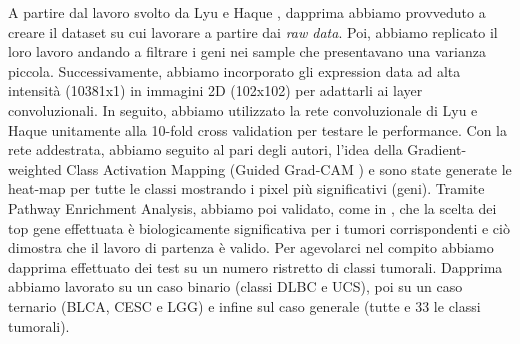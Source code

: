 A partire dal lavoro svolto da Lyu e Haque \cite{lyu2018deep}, dapprima abbiamo provveduto a creare il dataset 
su cui lavorare a partire dai \textit{raw data}. Poi, abbiamo replicato il loro lavoro andando a filtrare i geni 
nei sample che presentavano una varianza piccola. 
Successivamente, abbiamo incorporato gli expression data ad alta intensità (10381x1) in immagini 2D (102x102) 
per adattarli ai layer convoluzionali. In seguito, abbiamo utilizzato la rete convoluzionale di Lyu e Haque 
unitamente alla 10-fold cross validation per testare le performance. Con la rete addestrata, abbiamo seguito 
al pari degli autori, l'idea della Gradient-weighted Class Activation Mapping (Guided Grad-CAM \cite{selvaraju2017grad})
e sono state generate le heat-map per tutte le classi mostrando i pixel più significativi (geni). 
Tramite Pathway Enrichment Analysis, abbiamo poi validato, come in \cite{lyu2018deep}, che la scelta dei top gene
effettuata è biologicamente significativa per i tumori corrispondenti e ciò dimostra che il lavoro di partenza è valido.
Per agevolarci nel compito abbiamo dapprima effettuato dei test su un numero ristretto di classi tumorali.
Dapprima abbiamo lavorato su un caso binario (classi DLBC e UCS), poi su un caso ternario (BLCA, CESC e LGG) e 
infine sul caso generale (tutte e 33 le classi tumorali).

